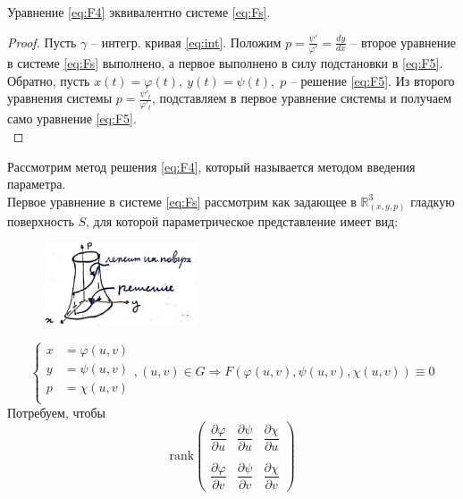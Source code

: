 \begin{proposition}
    Уравнение \eqref{eq:F4} эквивалентно системе \eqref{eq:Fs}.
\end{proposition}

\begin{proof}
    Пусть $\gamma $ -- интегр. кривая \eqref{eq:int}. Положим $ p = \frac{\psi'}{\varphi'} = \frac{dy}{dx} $ -- второе уравнение в системе \eqref{eq:Fs} выполнено, а первое выполнено в силу подстановки в \eqref{eq:F5}. Обратно, пусть $x(t) = \varphi(t), \ y(t) = \psi(t), \; p$ -- решение \eqref{eq:F5}. Из второго уравнения системы
    $ p = \frac{\psi'_t}{\varphi'_t}$, подставляем в первое уравнение системы и получаем само уравнение \eqref{eq:F5}.\\
\end{proof}

\begin{proposition}
    Рассмотрим метод решения \eqref{eq:F4}, который называется методом введения параметра. \\
    Первое уравнение в системе \eqref{eq:Fs} рассмотрим как задающее в $\mathbb{ R }^3_{(x, y, p)} $ гладкую поверхность $S$, для которой параметрическое представление имеет вид:
    \begin{figure}[!h]
        \centering
        \includegraphics[width = 0.4\textwidth]{image_1.jpeg}
    \end{figure}	
    \[
    \left\{
    \begin{aligned}
        x &= \varphi(u, v)  \\
        y &= \psi(u, v) \\   
        p &= \chi(u, v) \\
    \end{aligned}
    \right. , (u, v) \in G
    \Rightarrow  F(\varphi(u, v), \psi(u, v), \chi(u, v)) \equiv 0                                               
    \]
    Потребуем, чтобы
    \[
        \text{rank}
        \begin{pmatrix}
            \dfrac{\partial\varphi}{\partial u} & \dfrac{\partial \psi}{\partial u} & \dfrac{\partial \chi}{\partial u} \\
            \\
            \dfrac{\partial\varphi}{\partial v} & \dfrac{\partial \psi}{\partial v} & \dfrac{\partial \chi}{\partial v}

\end{pmatrix}\]
\end{proposition}

